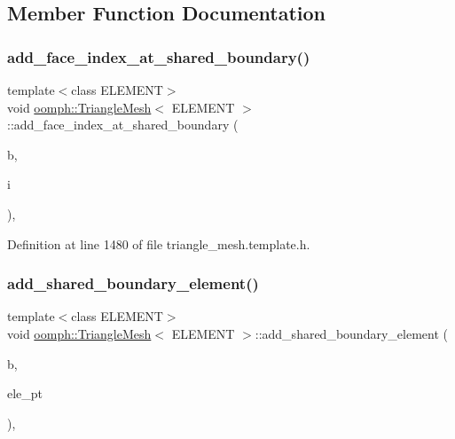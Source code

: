 \subsection{Member Function Documentation}
\mbox{\label{classoomph_1_1TriangleMesh_ad2159e98c8820cf6d3eecfce51ae0c78}} 
\subsubsection{\texorpdfstring{add\+\_\+face\+\_\+index\+\_\+at\+\_\+shared\+\_\+boundary()}{add\_face\_index\_at\_shared\_boundary()}}
{\footnotesize\ttfamily template$<$class E\+L\+E\+M\+E\+NT$>$ \\
void \hyperlink{classoomph_1_1TriangleMesh}{oomph\+::\+Triangle\+Mesh}$<$ E\+L\+E\+M\+E\+NT $>$\+::add\+\_\+face\+\_\+index\+\_\+at\+\_\+shared\+\_\+boundary (\begin{DoxyParamCaption}\item[{const unsigned \&}]{b,  }\item[{const unsigned \&}]{i }\end{DoxyParamCaption})\hspace{0.3cm}{\ttfamily [inline]}, {\ttfamily [protected]}}



Definition at line 1480 of file triangle\+\_\+mesh.\+template.\+h.

\mbox{\label{classoomph_1_1TriangleMesh_a822d7d8eb7d9367084d620654f7d9d1f}} 
\subsubsection{\texorpdfstring{add\+\_\+shared\+\_\+boundary\+\_\+element()}{add\_shared\_boundary\_element()}}
{\footnotesize\ttfamily template$<$class E\+L\+E\+M\+E\+NT$>$ \\
void \hyperlink{classoomph_1_1TriangleMesh}{oomph\+::\+Triangle\+Mesh}$<$ E\+L\+E\+M\+E\+NT $>$\+::add\+\_\+shared\+\_\+boundary\+\_\+element (\begin{DoxyParamCaption}\item[{const unsigned \&}]{b,  }\item[{Finite\+Element $\ast$}]{ele\+\_\+pt }\end{DoxyParamCaption})\hspace{0.3cm}{\ttfamily [inline]}, {\ttfamily [protected]}}




